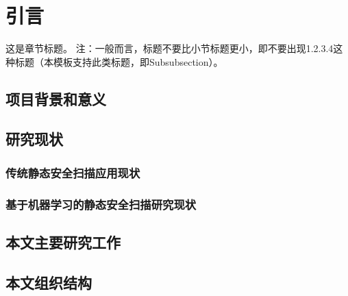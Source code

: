 \chapter{引言}

这是章节标题。
注：一般而言，标题不要比小节标题更小，即不要出现1.2.3.4这种标题（本模板支持此类标题，即Subsubsection）。

\section{项目背景和意义}

\section{研究现状}
\subsection{传统静态安全扫描应用现状}
\subsection{基于机器学习的静态安全扫描研究现状}

\section{本文主要研究工作}


\section{本文组织结构}